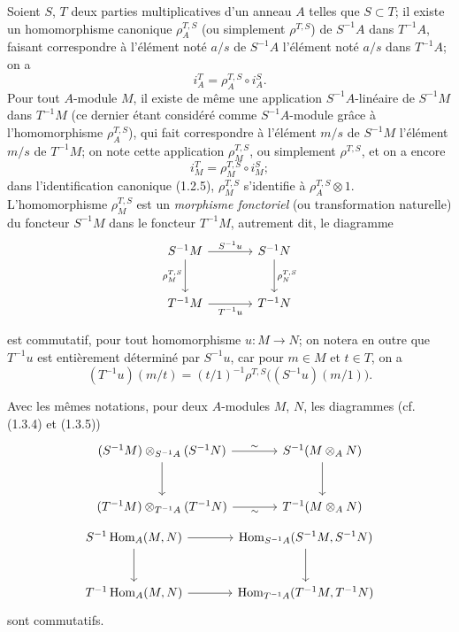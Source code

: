 \begin{env}[1.4.1]
\label{0.1.4.1-fr}
Soient $S$, $T$ deux parties multiplicatives d'un anneau $A$ telles que $S\subset T$; il existe un homomorphisme canonique $\rho_A^{T,S}$ (ou simplement $\rho^{T,S}$) de $S^{-1}A$ dans $T^{-1}A$, faisant correspondre à l'élément noté $a/s$ de $S^{-1}A$ l'élément noté $a/s$ dans $T^{-1}A$; on a
\[
  i_A^T=\rho_A^{T,S}\circ i_A^S.
\]
Pour tout $A$-module $M$, il existe de même une application $S^{-1}A$-linéaire de $S^{-1}M$ dans $T^{-1}M$ (ce dernier étant considéré comme $S^{-1}A$-module grâce à l'homomorphisme $\rho_A^{T,S}$), qui fait correspondre à l'élément $m/s$ de $S^{-1}M$ l'élément $m/s$ de $T^{-1}M$; on note cette application $\rho_M^{T,S}$, ou simplement $\rho^{T,S}$, et on a encore
\[
  i_M^T=\rho_M^{T,S}\circ i_M^S;
\]
dans l'identification canonique (1.2.5), $\rho_M^{T,S}$ s'identifie à $\rho_A^{T,S}\otimes 1$.
L'homomorphisme $\rho_M^{T,S}$ est un \emph{morphisme fonctoriel} (ou transformation naturelle) du foncteur $S^{-1}M$ dans le foncteur $T^{-1}M$, autrement dit, le diagramme
\[
\begin{tikzcd}[column sep=large,row sep=large]
S^{-1}M \arrow[r,"S^{-1}u"] \arrow[d,"\rho_M^{T,S}"'] & S^{-1}N \arrow[d,"\rho_N^{T,S}"] \\
T^{-1}M \arrow[r,"T^{-1}u"'] & T^{-1}N
\end{tikzcd}
\]

est commutatif, pour tout homomorphisme $u:M\to N$; on notera en outre que $T^{-1}u$ est entièrement déterminé par $S^{-1}u$, car pour $m\in M$ et $t\in T$, on a
\[
  (T^{-1}u)(m/t)=(t/1)^{-1}\rho^{T,S}\bigl((S^{-1}u)(m/1)\bigr).
\]
\end{env}

\begin{env}[1.4.2]
\label{0.1.4.2-fr}
Avec les mêmes notations, pour deux $A$-modules $M$, $N$, les diagrammes (cf. (1.3.4) et (1.3.5))
\[
\begin{tikzcd}[column sep=large,row sep=large]
(S^{-1}M)\otimes_{S^{-1}A}(S^{-1}N) \arrow[r,"\sim"] \arrow[d]
  & S^{-1}(M\otimes_A N) \arrow[d]
  \\
(T^{-1}M)\otimes_{T^{-1}A}(T^{-1}N) \arrow[r,"\sim"']
  & T^{-1}(M\otimes_A N)
\end{tikzcd}
\]
\[
\begin{tikzcd}[column sep=large,row sep=large]
S^{-1}\operatorname{Hom}_A(M,N) \arrow[r] \arrow[d]
  & \operatorname{Hom}_{S^{-1}A}(S^{-1}M,S^{-1}N) \arrow[d] \\
T^{-1}\operatorname{Hom}_A(M,N) \arrow[r]
  & \operatorname{Hom}_{T^{-1}A}(T^{-1}M,T^{-1}N)
\end{tikzcd}
\]
sont commutatifs.
\end{env}

